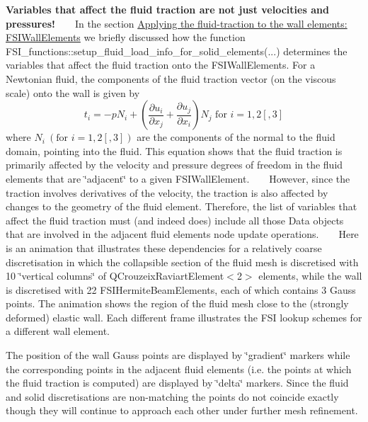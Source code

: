 \begin{DoxyItemize}
\item {\bfseries Variables that affect the fluid traction are not just velocities and pressures!} ~\newline
~\newline
 In the section \hyperlink{index_fsi_wall_elements}{Applying the fluid-\/traction to the wall elements\+: F\+S\+I\+Wall\+Elements} we briefly discussed how the function {\ttfamily F\+S\+I\+\_\+functions\+::setup\+\_\+fluid\+\_\+load\+\_\+info\+\_\+for\+\_\+solid\+\_\+elements}(...) determines the variables that affect the fluid traction onto the {\ttfamily F\+S\+I\+Wall\+Elements}. For a Newtonian fluid, the components of the fluid traction vector (on the viscous scale) onto the wall is given by \[ t_i = -p N_i + \left(\frac{\partial u_i}{\partial x_j} + \frac{\partial u_j}{\partial x_i} \right) N_j \mbox{ \ \ \ for $i=1,2[,3]$} \] where $ N_i \ (\mbox{for } i=1,2[,3]) $ are the components of the normal to the fluid domain, pointing into the fluid. This equation shows that the fluid traction is primarily affected by the velocity and pressure degrees of freedom in the fluid elements that are \char`\"{}adjacent\char`\"{} to a given {\ttfamily F\+S\+I\+Wall\+Element}. ~\newline
~\newline
 However, since the traction involves derivatives of the velocity, the traction is also affected by changes to the geometry of the fluid element. Therefore, the list of variables that affect the fluid traction must (and indeed does) include all those {\ttfamily Data} objects that are involved in the adjacent fluid elements\textquotesingle{} node update operations. ~\newline
~\newline
 Here is an animation that illustrates these dependencies for a relatively coarse discretisation in which the collapsible section of the fluid mesh is discretised with 10 \char`\"{}vertical columns\char`\"{} of {\ttfamily Q\+Crouzeix\+Raviart\+Element$<$2$>$} elements, while the wall is discretised with 22 {\ttfamily F\+S\+I\+Hermite\+Beam\+Elements}, each of which contains 3 Gauss points. The animation shows the region of the fluid mesh close to the (strongly deformed) elastic wall. Each different frame illustrates the F\+SI lookup schemes for a different wall element.
\begin{DoxyItemize}
\item The position of the wall Gauss points are displayed by \char`\"{}gradient\char`\"{} markers while the corresponding points in the adjacent fluid elements (i.\+e. the points at which the fluid traction is computed) are displayed by \char`\"{}delta\char`\"{} markers. Since the fluid and solid discretisations are non-\/matching the points do not coincide exactly though they will continue to approach each other under further mesh refinement.

\end{DoxyItemize}
\end{DoxyItemize}
